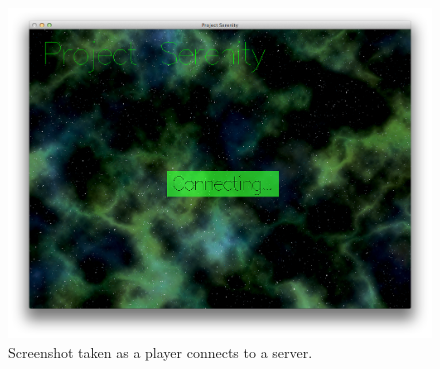 \begin{figure}[p]
	\includegraphics[width=15.5cm]{res/serenityscreens/06-connecting}
	\caption[Screenshot taken as a player connects to a server]{Screenshot taken as a player connects to a server.}
	\label{fig:connecting}
\end{figure}

